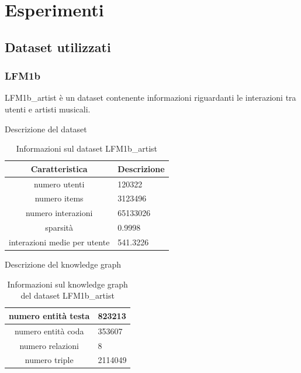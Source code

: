 \section{Esperimenti}

\subsection{Dataset utilizzati}
\subsubsection{LFM1b}


LFM1b\_artist è un dataset contenente informazioni riguardanti le interazioni tra utenti e artisti musicali.

\noindent Descrizione del dataset
\begin{table}[H]
    \centering
    \footnotesize
    \begin{tabularx}{\textwidth}{|c|X|}
        \hline
        \textbf{Caratteristica} & \textbf{Descrizione} \\
        \hline
        numero utenti & 120322 \\
        \hline
        numero items & 3123496 \\
        \hline
        numero interazioni & 65133026 \\
        \hline
        sparsità & 0.9998 \\
        \hline
        interazioni medie per utente & 541.3226 \\
        \hline
    \end{tabularx}
    \caption{Informazioni sul dataset LFM1b\_artist}
    \label{tab:dataset_info}
\end{table}


\noindent Descrizione del knowledge graph
\begin{table}[H]
    \centering
    \footnotesize
    \begin{tabularx}{\textwidth}{|c|X|}
        \hline
        numero entità testa & 823213 \\
        \hline
        numero entità coda & 353607 \\
        \hline
        numero relazioni & 8 \\
        \hline
        numero triple & 2114049 \\
        \hline
    \end{tabularx}
    \caption{Informazioni sul knowledge graph del dataset LFM1b\_artist}
    \label{tab:dataset_info}
\end{table}




